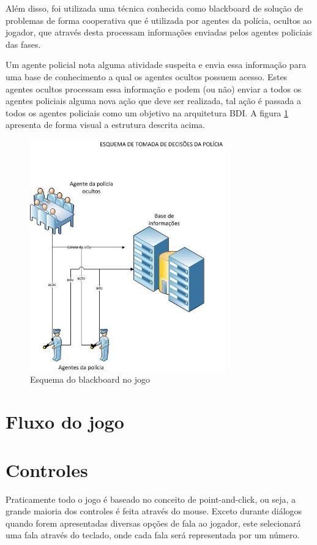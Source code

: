 Além disso, foi utilizada uma técnica conhecida como blackboard de solução de problemas de forma cooperativa que é utilizada por agentes da polícia, ocultos ao jogador, que através desta processam informações enviadas pelos agentes policiais das fases.

Um agente policial nota alguma atividade suspeita e envia essa informação para uma base de conhecimento a qual os agentes ocultos possuem acesso. Estes agentes ocultos processam essa informação e podem (ou não) enviar a todos os agentes policiais alguma nova ação que deve ser realizada, tal ação é passada a todos os agentes policiais como um objetivo na arquitetura BDI.
A figura \ref{blackboard_policia} apresenta de forma visual a estrutura descrita acima.
\begin{figure}
\centering
\includegraphics [height=10cm]{figuras/blackboard_policia.jpg}
\caption{Esquema do blackboard no jogo}
\label{blackboard_policia}
\end{figure}

\section{Fluxo do jogo}

\section{Controles}
Praticamente todo o jogo é baseado no conceito de point-and-click, ou seja, a grande maioria dos controles é feita através do mouse. Exceto durante diálogos quando forem apresentadas diversas opções de fala ao jogador, este selecionará uma fala através do teclado, onde cada fala será representada por um número.

